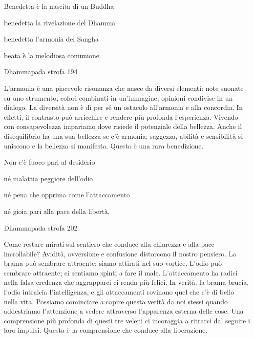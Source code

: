 \documentclass[a4paper,portrait,12pt]{article}
\begin{document}
\newpage



Benedetta \`{e} la nascita di un Buddha


benedetta la rivelazione del Dhamma


benedetta l'armonia del Sangha


beata \`{e} la melodiosa comunione.





Dhammapada strofa 194


\newpage



L'armonia \`{e} una piacevole risonanza che nasce da diversi elementi: note suonate su uno strumento, colori combinati in un'immagine, opinioni condivise in un dialogo. La diversit\`{a} non \`{e} di per s\'{e} un ostacolo all'armonia e alla concordia. In effetti, il contrasto pu\`{o} arricchire e rendere più profonda l'esperienza. Vivendo con consapevolezza impariamo dove risiede il potenziale della bellezza. Anche il disequilibrio ha una sua bellezza se c'\`{e} armonia; saggezza, abilit\`{a} e sensibilit\`{a} si uniscono e la bellezza si manifesta. Questa \`{e} una rara benedizione.


\newpage



Non c'\`{e} fuoco pari al desiderio


n\'{e} malattia peggiore dell'odio


n\'{e} pena che opprima come l'attaccamento   


n\'{e} gioia pari alla pace della libert\`{a}.   





Dhammapada strofa 202


\newpage



Come restare mirati sul sentiero che conduce alla chiarezza e alla pace incrollabile? Avidit\`{a}, avversione e confusione distorcono il nostro pensiero. La brama pu\`{o} sembrare attraente; siamo attirati nel suo vortice. L'odio pu\`{o} sembrare attraente; ci sentiamo spinti a fare il male. L'attaccamento ha radici nella falsa credenza che aggrapparci ci renda più felici. In verit\`{a}, la brama brucia, l'odio intralcia l'intelligenza, e gli attaccamenti rovinano quel che c'\`{e} di bello nella vita. Possiamo cominciare a capire questa verit\`{a} da noi stessi quando addestriamo l'attenzione a vedere attraverso l'apparenza esterna delle cose. Una comprensione più profonda di questi tre veleni ci incoraggia a ritrarci dal seguire i loro impulsi. Questa \`{e} la comprensione che conduce alla liberazione.
\end{document}
